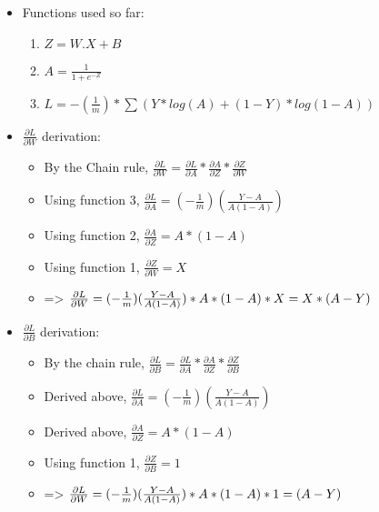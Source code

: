 \documentclass[10pt,a4paper]{article}
\begin{document}
\begin{itemize}
    \item Functions used so far:
    \begin{enumerate}
        \item $Z = W . X + B$
        \item $A = \frac{1}{1+e^{-Z}}$
        \item $L = -(\frac{1}{m}) * \sum(Y * log(A) + (1-Y) * log(1-A))$
    \end{enumerate}
    \item $\frac{\partial{L}}{\partial{W}}$ derivation:
    \begin{itemize}
        \item By the Chain rule, $\frac{\partial{L}}{\partial{W}} = \frac{\partial{L}}{\partial{A}} * \frac{\partial{A}}{\partial{Z}} * \frac{\partial{Z}}{\partial{W}}$
        \item Using function 3, $\frac{\partial{L}}{\partial{A}} = (-\frac{1}{m})(\frac{Y-A}{A(1-A)})$
        \item Using function 2, $\frac{\partial{A}}{\partial{Z}} = A * (1-A)$
        \item Using function 1, $\frac{\partial{Z}}{\partial{W}} = X$
        \item => $\frac{\partial{L}}{\partial{W}} = (-\frac{1}{m})(\frac{Y-A}{A(1-A)}) * A * (1-A) * X\\
              = X * (A-Y)$
    \end{itemize}
    \item $\frac{\partial{L}}{\partial{B}}$ derivation:
    \begin{itemize}
        \item By the chain rule, $\frac{\partial{L}}{\partial{B}} = \frac{\partial{L}}{\partial{A}} * \frac{\partial{A}}{\partial{Z}} * \frac{\partial{Z}}{\partial{B}}$
        \item Derived above, $\frac{\partial{L}}{\partial{A}} = (-\frac{1}{m})(\frac{Y-A}{A(1-A)})$
        \item Derived above, $\frac{\partial{A}}{\partial{Z}} = A * (1-A)$
        \item Using function 1, $\frac{\partial{Z}}{\partial{B}} = 1$
        \item => $\frac{\partial{L}}{\partial{W}} = (-\frac{1}{m})(\frac{Y-A}{A(1-A)}) * A * (1-A) * 1\\
              = (A-Y)$
    \end{itemize}
\end{itemize}
\end{document}
